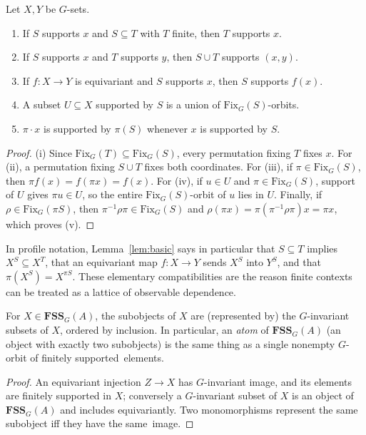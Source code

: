 \documentclass{lmcs}
\newcommand{\Fix}{\mathrm{Fix}}
\newcommand{\FSS}{\mathbf{FSS}}
\begin{document}
\begin{lem}\label{lem:basic}
Let $X,Y$ be $G$-sets.
\begin{enumerate}[label=\textup{(\roman*)}]
\item If $S$ supports $x$ and $S\subseteq T$ with $T$ finite, then $T$ supports $x$.
\item If $S$ supports $x$ and $T$ supports $y$, then $S\cup T$
supports $(x,y)$.
\item If $f:X\to Y$ is equivariant and $S$ supports $x$, then $S$
supports $f(x)$.
\item A subset $U\subseteq X$ supported by $S$ is a union of
$\Fix_G(S)$-orbits.
\item $\pi\cdot x$ is supported by $\pi(S)$ whenever $x$ is supported
by $S$.
\end{enumerate}
\end{lem}
\begin{proof}
(i) Since $\Fix_G(T)\subseteq\Fix_G(S)$, every permutation fixing $T$
fixes $x$. For (ii), a permutation fixing $S\cup T$ fixes both
coordinates. For (iii), if $\pi\in\Fix_G(S)$, then
$\pi f(x)=f(\pi x)=f(x)$. For (iv), if $u\in U$ and
$\pi\in\Fix_G(S)$, support of $U$ gives $\pi u\in U$, so the entire
$\Fix_G(S)$-orbit of $u$ lies in $U$. Finally, if
$\rho\in\Fix_G(\pi S)$, then $\pi^{-1}\rho\pi\in\Fix_G(S)$ and
$\rho(\pi x)=\pi(\pi^{-1}\rho\pi)x=\pi x$, which proves (v).
\end{proof}

In profile notation, Lemma~\ref{lem:basic} says in particular that
$S\subseteq T$ implies $X^S\subseteq X^T$, that an equivariant map
$f:X\to Y$ sends $X^S$ into $Y^S$, and that
$\pi(X^S)=X^{\pi S}$. These elementary compatibilities are the reason
finite contexts can be treated as a lattice of observable dependence.

\begin{lem}\label{lem:subobj}
For $X\in\FSS_G(A)$, the subobjects of $X$ are (represented by) the
$G$-invariant subsets of $X$, ordered by inclusion. In particular, an
\emph{atom} of $\FSS_G(A)$ (an object with exactly two subobjects) is the same thing as a single nonempty $G$-orbit of finitely
supported~elements.
\end{lem}

\begin{proof}
An equivariant injection $Z\to X$ has $G$-invariant image, and its
elements are finitely supported in $X$; conversely a $G$-invariant
subset of $X$ is an object of $\FSS_G(A)$ and includes equivariantly.
Two monomorphisms represent the same subobject iff they have the same~image.
\end{proof}
\end{document}

